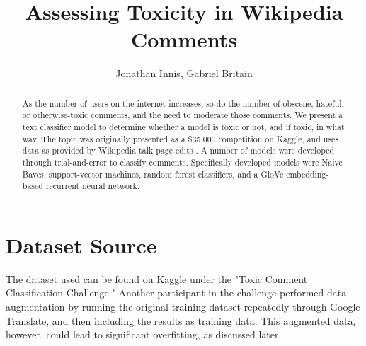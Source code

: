 \documentclass{article}
\title{Assessing Toxicity in Wikipedia Comments}
\author{Jonathan Innis, Gabriel Britain}
\date{}
\begin{document}
\begin{titlepage}
	\maketitle
	\tableofcontents{}
\end{titlepage}

\begin{abstract}
	As the number of users on the internet increases, so do the number of
	obscene, hateful, or otherwise-toxic comments, and the need to moderate
	those comments. We present a text classifier model to determine whether
	a model is toxic or not, and if toxic, in what way. The topic was
	originally presented as a \$35,000 competition on Kaggle, and uses data
	as provided by Wikipedia talk page edits
	\cite{Wulczyn:2017:EMP:3038912.3052591}. A number of models were
	developed through trial-and-error to classify comments. Specifically
	developed models were Naive Bayes, support-vector machines, random
	forest classifiers, and a GloVe embedding-based recurrent neural
	network.
\end{abstract}

\section{Dataset Source}{
  The dataset used can be found on Kaggle under the "Toxic Comment
  Classification Challenge." Another participant in the challenge
  performed data augmentation by running the original training dataset
  repeatedly through Google Translate, and then including the results as
  training data. This augmented data, however, could lead to significant
  overfitting, as discussed later.
 }
\end{document}
